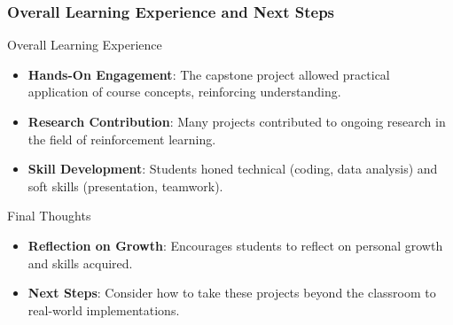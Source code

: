 \documentclass{beamer}
\begin{document}
\begin{frame}[fragile]
    \frametitle{Overall Learning Experience and Next Steps}
    \begin{block}{Overall Learning Experience}
        \begin{itemize}
            \item \textbf{Hands-On Engagement}: The capstone project allowed practical application of course concepts, reinforcing understanding.
            \item \textbf{Research Contribution}: Many projects contributed to ongoing research in the field of reinforcement learning.
            \item \textbf{Skill Development}: Students honed technical (coding, data analysis) and soft skills (presentation, teamwork).
        \end{itemize}
    \end{block}

    \begin{block}{Final Thoughts}
        \begin{itemize}
            \item \textbf{Reflection on Growth}: Encourages students to reflect on personal growth and skills acquired.
            \item \textbf{Next Steps}: Consider how to take these projects beyond the classroom to real-world implementations.
        \end{itemize}
    \end{block}
\end{frame}
\end{document}
